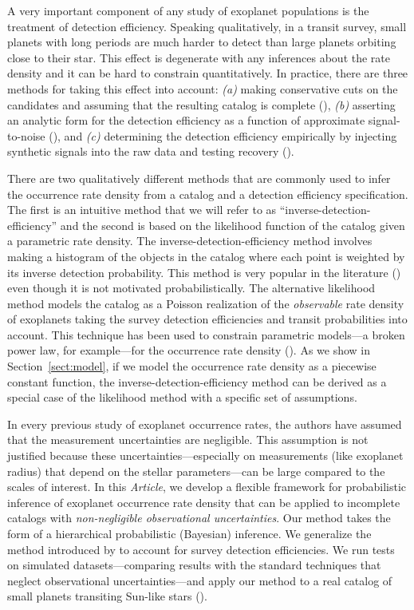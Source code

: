 \documentclass[12pt,preprint]{aastex}
\newcommand{\paper}{\textsl{Article}}
\newcommand{\Sect}[1]{Section~\ref{sect:#1}}
\newcommand{\sect}[1]{\Sect{#1}}
\begin{document}
A very important component of any study of exoplanet populations is the
treatment of detection efficiency.
Speaking qualitatively, in a transit survey, small planets with long periods
are much harder to detect than large planets orbiting close to their star.
This effect is degenerate with any inferences about the rate density and it
can be hard to constrain quantitatively.
In practice, there are three methods for taking this effect into account:
\emph{(a)} making conservative cuts on the candidates and assuming that the
resulting catalog is complete (\citealt{catanzarite, traub, tremaine}),
\emph{(b)} asserting an analytic form for the detection efficiency as a
function of approximate signal-to-noise (\citealt{youdin, howard, dressing,
dong, fressin-fp, morton-swift}), and \emph{(c)} determining the detection
efficiency empirically by injecting synthetic signals into the raw data and
testing recovery (\citealt{pixel, petigura-a, petigura}).

There are two qualitatively different methods that are commonly used to infer
the occurrence rate density from a catalog and a detection efficiency
specification.
The first is an intuitive method that we will refer to as
``inverse-detection-efficiency'' and the second is based on the likelihood
function of the catalog given a parametric rate density.
The inverse-detection-efficiency method involves making a histogram of the
objects in the catalog where each point is weighted by its inverse detection
probability.
This method is very popular in the literature (\citealt{howard, dong,
dressing, swift, petigura}) even though it is not motivated probabilistically.
The alternative likelihood method models the catalog as a Poisson realization
of the \emph{observable} rate density of exoplanets taking the survey
detection efficiencies and transit probabilities into account.
This technique has been used to constrain parametric models---a broken power
law, for example---for the occurrence rate density (\citealt{tabachnik,
youdin, dong}).
As we show in \sect{model}, if we model the occurrence rate density as a
piecewise constant function, the inverse-detection-efficiency method can be
derived as a special case of the likelihood method with a specific set of
assumptions.

In every previous study of exoplanet occurrence rates, the authors have
assumed that the measurement uncertainties are negligible.
This assumption is not justified because these uncertainties---especially on
measurements (like exoplanet radius) that depend on the stellar
parameters---can be large compared to the scales of interest.
In this \paper, we develop a flexible framework for probabilistic inference of
exoplanet occurrence rate density that can be applied to incomplete catalogs
with \emph{non-negligible observational uncertainties}.
Our method takes the form of a hierarchical probabilistic (Bayesian)
inference.
We generalize the method introduced by \citet{hogge} to account for survey
detection efficiencies.
We run tests on simulated datasets---comparing results with the standard
techniques that neglect observational uncertainties---and apply our method to
a real catalog of small planets transiting Sun-like stars
(\citealt{petigura}).
\end{document}
